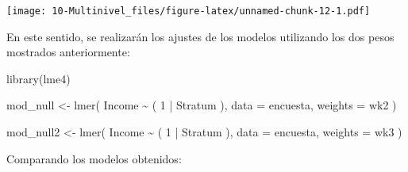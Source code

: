 \documentclass[
  12pt,
]{book}
\newenvironment{Shaded}{\begin{snugshade}}{\end{snugshade}}
\newcommand{\AttributeTok}[1]{\textcolor[rgb]{0.77,0.63,0.00}{#1}}
\newcommand{\DecValTok}[1]{\textcolor[rgb]{0.00,0.00,0.81}{#1}}
\newcommand{\FunctionTok}[1]{\textcolor[rgb]{0.00,0.00,0.00}{#1}}
\newcommand{\NormalTok}[1]{#1}
\newcommand{\OtherTok}[1]{\textcolor[rgb]{0.56,0.35,0.01}{#1}}
\newcommand{\SpecialCharTok}[1]{\textcolor[rgb]{0.00,0.00,0.00}{#1}}
\newcommand{\StringTok}[1]{\textcolor[rgb]{0.31,0.60,0.02}{#1}}
\begin{document}
\texttt{[image: 10-Multinivel\_files/figure-latex/unnamed-chunk-12-1.pdf]}

En este sentido, se realizarán los ajustes de los modelos utilizando los dos pesos mostrados anteriormente:

\begin{Shaded}
\begin{Highlighting}[]
\FunctionTok{library}\NormalTok{(lme4) }

\NormalTok{mod\_null  }\OtherTok{\textless{}{-}} \FunctionTok{lmer}\NormalTok{( Income  }\SpecialCharTok{\textasciitilde{}}\NormalTok{ ( }\DecValTok{1}  \SpecialCharTok{|}\NormalTok{  Stratum ),}
                   \AttributeTok{data  =}\NormalTok{  encuesta, }
             \AttributeTok{weights  =}\NormalTok{  wk2 ) }

\NormalTok{mod\_null2  }\OtherTok{\textless{}{-}} \FunctionTok{lmer}\NormalTok{( Income  }\SpecialCharTok{\textasciitilde{}}\NormalTok{ ( }\DecValTok{1}  \SpecialCharTok{|}\NormalTok{  Stratum ), }
                    \AttributeTok{data  =}\NormalTok{  encuesta, }
             \AttributeTok{weights  =}\NormalTok{  wk3 )}
\end{Highlighting}
\end{Shaded}

Comparando los modelos obtenidos:

\begin{Shaded}
\end{Shaded}
\end{document}
